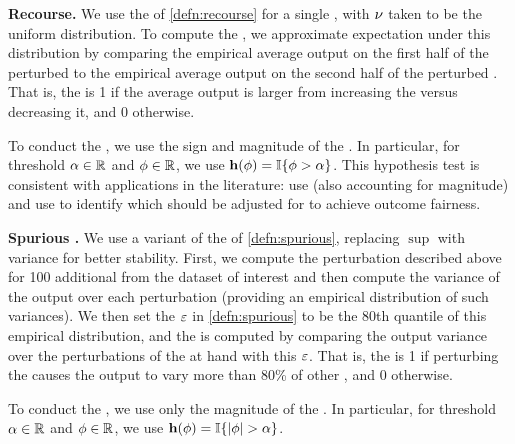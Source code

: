 \textbf{Recourse.} 
We use the \taskname{} of %
\cref{defn:recourse} for a single \covname{}, with $\nu$ taken to be the uniform distribution.
To compute the \groundname{}, we approximate expectation under this distribution by comparing the empirical average \modelname{} output on the first half of the perturbed \obsnames{} to the empirical average \modelname{} output on the second half of the perturbed \obsnames{}.
That is, the \groundname{} is 1 if the average \modelname{} output is larger from increasing the \covname{} versus decreasing it, and 0 otherwise.

To conduct the \hyptestname{}, we use the sign and magnitude of the \covname{} \attname{}.
In particular, for threshold $\alpha\in\mathbb{R}$ and \covname{} \attname{} $\phi\in\mathbb{R}$, we use $\mathbf{h}(\phi) = \mathbb{I}\{\phi > \alpha\}$.
%
This hypothesis test is consistent with applications in the literature: \citet{aditya20biased} use \shap{} (also accounting for magnitude) and \citet{ghosh22fair} use \intgradshort{} to identify which \covnames{} should be adjusted for to achieve outcome fairness.
%

\textbf{Spurious \covNames{}.} 
%
We use a variant of the  \taskname{} of \cref{defn:spurious}, replacing $\sup$ with variance for better stability.
First, we compute the perturbation described above for 100 additional \obsnames{} from the dataset of interest and then compute the variance of the \modelname{} output over each perturbation (providing an empirical distribution of such variances). 
We then set the $\varepsilon$ in \cref{defn:spurious} to be the 80th quantile of this empirical distribution, and the \groundname{} is computed by comparing the \modelname{} output variance over the perturbations of the \obsname{} at hand with this $\varepsilon$. 
That is, the \groundname{} is 1 if perturbing the \covname{} causes the \modelname{} output to vary more than 80\% of other \covnames{}, and 0 otherwise.

To conduct the \hyptestname{}, we use only the magnitude of the \covname{} \attname{}.
In particular, for threshold $\alpha\in\mathbb{R}$ and \covname{} \attname{} $\phi\in\mathbb{R}$, we use $\oraclehyptest(\expval) = \ind{\abs{\expval} > \threshval}$.

%
%
%
%
%
%
%

%
%
%

\subsubsection{\fielddefNAMEs{}}

